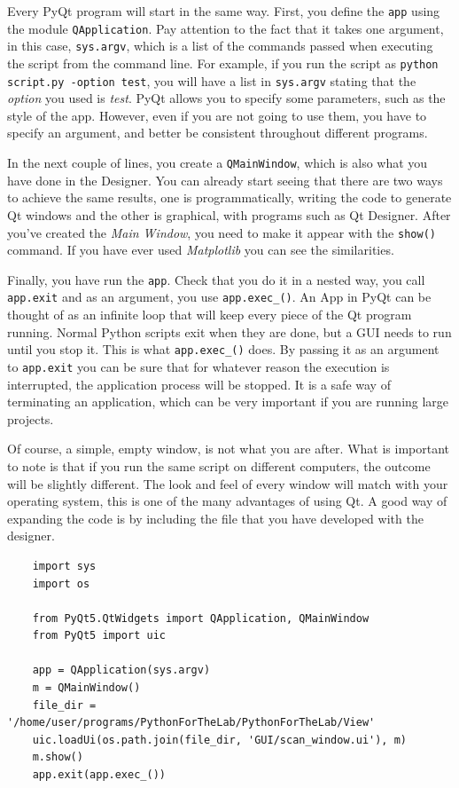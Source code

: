 Every PyQt program will start in the same way. First, you define the
\texttt{app} using the module \texttt{QApplication}. Pay attention to
the fact that it takes one argument, in this case, \texttt{sys.argv},
which is a list of the commands passed when executing the script from
the command line. For example, if you run the script as
\texttt{python script.py -option test}, you will have a list in
\texttt{sys.argv} stating that the \emph{option} you used is
\emph{test}. PyQt allows you to specify some parameters, such as the
style of the app. However, even if you are not going to use them, you
have to specify an argument, and better be consistent throughout
different programs.

In the next couple of lines, you create a \texttt{QMainWindow}, which is
also what you have done in the Designer. You can already start seeing
that there are two ways to achieve the same results, one is
programmatically, writing the code to generate Qt windows and the other
is graphical, with programs such as Qt Designer. After you've created
the \emph{Main Window}, you need to make it appear with the
\texttt{show()} command. If you have ever used \emph{Matplotlib} you can
see the similarities.

Finally, you have run the \texttt{app}. Check that you do it in a nested
way, you call \texttt{app.exit} and as an argument, you use
\texttt{app.exec_()}. An App in PyQt can be thought of as an infinite
loop that will keep every piece of the Qt program running. Normal Python
scripts exit when they are done, but a {GUI} needs to run until you stop
it. This is what \texttt{app.exec_()} does. By passing it as an
argument to \texttt{app.exit} you can be sure that for whatever reason
the execution is interrupted, the application process will be stopped.
It is a safe way of terminating an application, which can be very
important if you are running large projects.

Of course, a simple, empty window, is not what you are after. What is
important to note is that if you run the same script on different
computers, the outcome will be slightly different. The look and feel of
every window will match with your operating system, this is one of the
many advantages of using Qt. A good way of expanding the code is by
including the file that you have developed with the designer.

\begin{verbatim}
    import sys
    import os

    from PyQt5.QtWidgets import QApplication, QMainWindow
    from PyQt5 import uic

    app = QApplication(sys.argv)
    m = QMainWindow()
    file_dir = '/home/user/programs/PythonForTheLab/PythonForTheLab/View'
    uic.loadUi(os.path.join(file_dir, 'GUI/scan_window.ui'), m)
    m.show()
    app.exit(app.exec_())
\end{verbatim}

